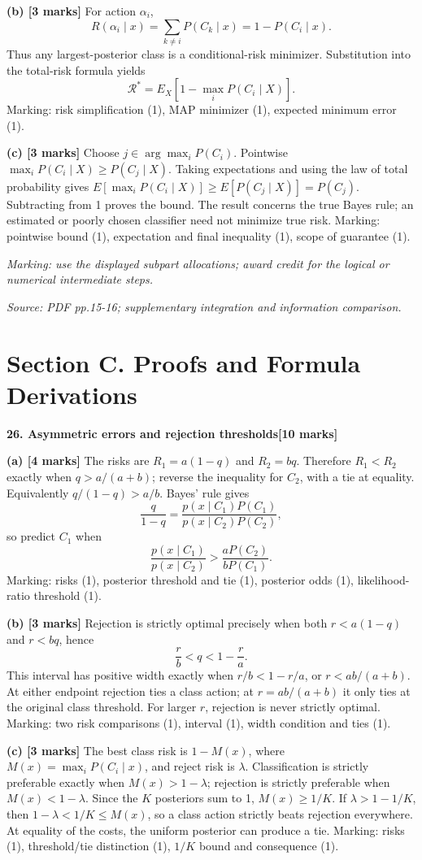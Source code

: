 \documentclass[11pt,a4paper]{article}
\begin{document}
\textbf{(b) [3 marks]} For action \(\alpha_i\),
\[
R(\alpha_i\mid x)=\sum_{k\ne i}P(C_k\mid x)=1-P(C_i\mid x).
\]
Thus any largest-posterior class is a conditional-risk minimizer. Substitution into the total-risk formula yields
\[
\mathcal R^*=E_X[1-\max_iP(C_i\mid X)].
\]
Marking: risk simplification (1), MAP minimizer (1), expected minimum error (1).

\textbf{(c) [3 marks]} Choose \(j\in\arg\max_iP(C_i)\). Pointwise \(\max_iP(C_i\mid X)\ge P(C_j\mid X)\). Taking expectations and using the law of total probability gives \(E[\max_iP(C_i\mid X)]\ge E[P(C_j\mid X)]=P(C_j)\). Subtracting from 1 proves the bound. The result concerns the true Bayes rule; an estimated or poorly chosen classifier need not minimize true risk. Marking: pointwise bound (1), expectation and final inequality (1), scope of guarantee (1).

\textit{Marking: use the displayed subpart allocations; award credit for the logical or numerical intermediate steps.}\par
{\footnotesize\textit{Source: PDF pp.15-16; supplementary integration and information comparison.}}
\newpage\section*{Section C. Proofs and Formula Derivations}
\textbf{26. Asymmetric errors and rejection thresholds}\hfill\textbf{[10 marks]}\par\medskip
\textbf{(a) [4 marks]} The risks are \(R_1=a(1-q)\) and \(R_2=bq\). Therefore \(R_1<R_2\) exactly when \(q>a/(a+b)\); reverse the inequality for \(C_2\), with a tie at equality. Equivalently \(q/(1-q)>a/b\). Bayes' rule gives
\[
\frac{q}{1-q}=\frac{p(x\mid C_1)P(C_1)}{p(x\mid C_2)P(C_2)},
\]
so predict \(C_1\) when
\[
\frac{p(x\mid C_1)}{p(x\mid C_2)}>
\frac{aP(C_2)}{bP(C_1)}.
\]
Marking: risks (1), posterior threshold and tie (1), posterior odds (1), likelihood-ratio threshold (1).

\textbf{(b) [3 marks]} Rejection is strictly optimal precisely when both \(r<a(1-q)\) and \(r<bq\), hence
\[
\frac rb<q<1-\frac ra.
\]
This interval has positive width exactly when \(r/b<1-r/a\), or \(r<ab/(a+b)\). At either endpoint rejection ties a class action; at \(r=ab/(a+b)\) it only ties at the original class threshold. For larger \(r\), rejection is never strictly optimal. Marking: two risk comparisons (1), interval (1), width condition and ties (1).

\textbf{(c) [3 marks]} The best class risk is \(1-M(x)\), where \(M(x)=\max_iP(C_i\mid x)\), and reject risk is \(\lambda\). Classification is strictly preferable exactly when \(M(x)>1-\lambda\); rejection is strictly preferable when \(M(x)<1-\lambda\). Since the \(K\) posteriors sum to 1, \(M(x)\ge1/K\). If \(\lambda>1-1/K\), then \(1-\lambda<1/K\le M(x)\), so a class action strictly beats rejection everywhere. At equality of the costs, the uniform posterior can produce a tie. Marking: risks (1), threshold/tie distinction (1), \(1/K\) bound and consequence (1).
\end{document}
